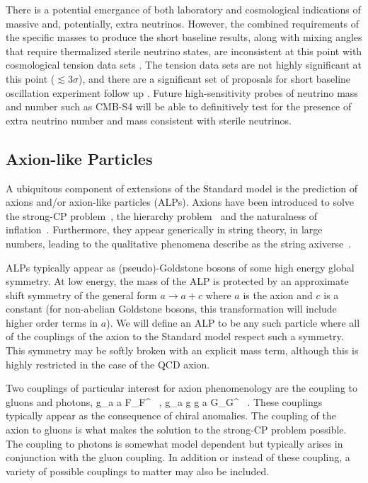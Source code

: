 There is a potential emergance of both laboratory and cosmological
indications of massive and, potentially, extra neutrinos. However, the
combined requirements of the specific masses to produce the short
baseline results, along with mixing angles that require thermalized
sterile neutrino states, are inconsistent at this point with
cosmological tension data sets
\cite{Joudaki:2012uk,Archidiacono:2013xxa}. The tension data sets are
not highly significant at this point ($\lesssim 3\sigma$), and there
are a significant set of proposals for short baseline oscillation
experiment follow up \cite{Abazajian:2012ys}. Future high-sensitivity
probes of neutrino mass and number such as CMB-S4 will be able to
definitively test for the presence of extra neutrino number and mass
consistent with sterile neutrinos.


\subsection{Axion-like Particles}

A ubiquitous component of extensions of the Standard model is the prediction of axions and/or axion-like particles (ALPs).  Axions have been introduced to solve the strong-CP problem~\cite{Peccei:1977hh}, the hierarchy problem~\cite{Graham:2015cka} and the naturalness of inflation~\cite{Freese:1990rb}.  Furthermore, they appear generically in string theory, in large numbers, leading to the qualitative phenomena describe as the string axiverse~\cite{Arvanitaki:2009fg}.

ALPs typically appear as (pseudo)-Goldstone bosons of some high energy global symmetry.  At low energy, the mass of the ALP is protected by an approximate shift symmetry of the general form $a \to a + c$ where $a$ is the axion and $c$ is a constant (for non-abelian Goldstone bosons, this transformation will include higher order terms in $a$).  We will define an ALP to be any such particle where all of the couplings of the axion to the Standard model respect such a symmetry.  This symmetry may be softly broken with an explicit mass term, although this is highly restricted in the case of the QCD axion.

Two couplings of particular interest for axion phenomenology are the coupling to gluons and photons, 
\beq
{} g_{a \gamma \gamma} a \tilde F_{\mu \nu}F^{\mu\nu} \ , \qquad \qquad {} g_{a g g} a \tilde G_{\mu \nu}G^{\mu\nu}  \ .
\eeq
These couplings typically appear as the consequence of chiral anomalies.  The coupling of the axion to gluons is what makes the solution to the strong-CP problem possible.  The coupling to photons is somewhat model dependent but typically arises in conjunction with the gluon coupling.  In addition or instead of these coupling, a variety of possible couplings to matter may also be included.

